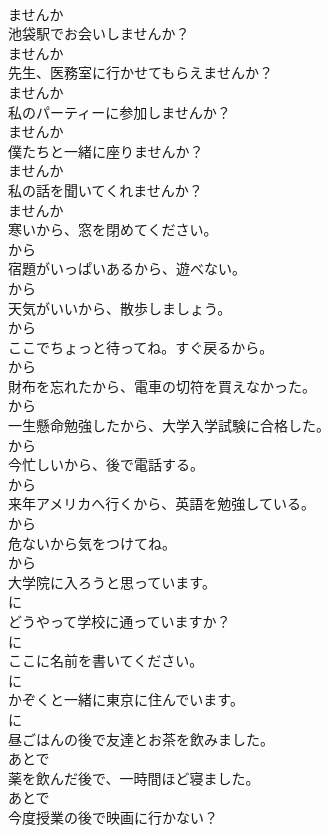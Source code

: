 \documentclass[8pt]{extreport}
\begin{document}
\begin{CJK}{UTF8}{min}
\\	ませんか
\\	池袋駅でお会いしませんか？	
\\	ませんか
\\	先生、医務室に行かせてもらえませんか？	
\\	ませんか
\\	私のパーティーに参加しませんか？	
\\	ませんか
\\	僕たちと一緒に座りませんか？	
\\	ませんか
\\	私の話を聞いてくれませんか？	
\\	ませんか
\\	寒いから、窓を閉めてください。	
\\	から
\\	宿題がいっぱいあるから、遊べない。	
\\	から
\\	天気がいいから、散歩しましょう。	
\\	から
\\	ここでちょっと待ってね。すぐ戻るから。	
\\	から
\\	財布を忘れたから、電車の切符を買えなかった。	
\\	から
\\	一生懸命勉強したから、大学入学試験に合格した。	
\\	から
\\	今忙しいから、後で電話する。	
\\	から
\\	来年アメリカへ行くから、英語を勉強している。	
\\	から
\\	危ないから気をつけてね。	
\\	から
\\	大学院に入ろうと思っています。	
\\	に
\\	どうやって学校に通っていますか？	
\\	に
\\	ここに名前を書いてください。	
\\	に
\\	かぞくと一緒に東京に住んでいます。	
\\	に
\\	昼ごはんの後で友達とお茶を飲みました。	
\\	あとで
\\	薬を飲んだ後で、一時間ほど寝ました。	
\\	あとで
\\	今度授業の後で映画に行かない？	

\end{CJK}
\end{document}

